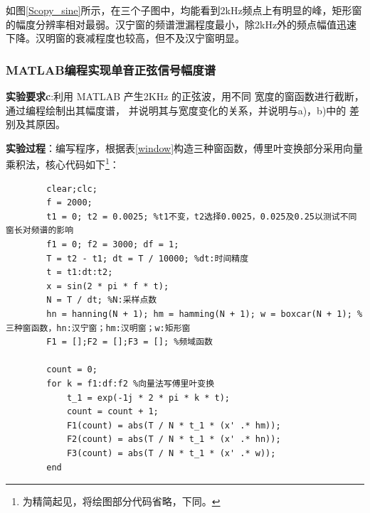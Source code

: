 \documentclass[12pt]{article}
\begin{document}
如图\ref{Scopy_sine}所示，在三个子图中，均能看到2kHz频点上有明显的峰，矩形窗的幅度分辨率相对最弱。汉宁窗的频谱泄漏程度最小，除2kHz外的频点幅值迅速下降。汉明窗的衰减程度也较高，但不及汉宁窗明显。


\subsubsection{MATLAB编程实现单音正弦信号幅度谱}

\textbf{实验要求c}:利用 MATLAB 产生2KHz 的正弦波，用不同
宽度的窗函数进行截断，通过编程绘制出其幅度谱，
并说明其与宽度变化的关系，并说明与a)，b)中的
差别及其原因。

\textbf{实验过程}：编写程序，根据表\ref{window}构造三种窗函数，傅里叶变换部分采用向量乘积法，核心代码如下\footnote{为精简起见，将绘图部分代码省略，下同。}：
\begin{lstlisting}
        clear;clc;
        f = 2000;
        t1 = 0; t2 = 0.0025; %t1不变，t2选择0.0025，0.025及0.25以测试不同窗长对频谱的影响
        f1 = 0; f2 = 3000; df = 1;
        T = t2 - t1; dt = T / 10000; %dt:时间精度
        t = t1:dt:t2;
        x = sin(2 * pi * f * t);
        N = T / dt; %N:采样点数
        hn = hanning(N + 1); hm = hamming(N + 1); w = boxcar(N + 1); %三种窗函数，hn:汉宁窗；hm:汉明窗；w:矩形窗
        F1 = [];F2 = [];F3 = []; %频域函数
    
        count = 0;
        for k = f1:df:f2 %向量法写傅里叶变换
            t_1 = exp(-1j * 2 * pi * k * t);
            count = count + 1;
            F1(count) = abs(T / N * t_1 * (x' .* hm));
            F2(count) = abs(T / N * t_1 * (x' .* hn));
            F3(count) = abs(T / N * t_1 * (x' .* w));
        end
\end{lstlisting}
\end{document}

